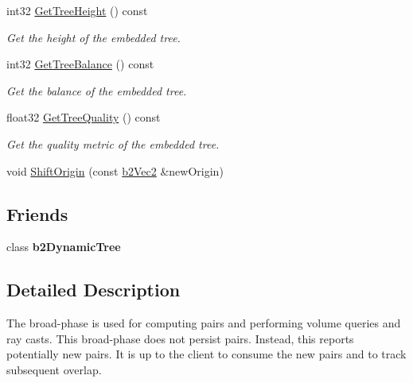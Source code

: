 \begin{DoxyCompactItemize}
int32 \hyperlink{classb2_broad_phase_a868f95225d62c3ea79d231ed305253ea}{Get\+Tree\+Height} () const
\begin{DoxyCompactList}\small\item\em Get the height of the embedded tree. \end{DoxyCompactList}\item 
\mbox{\label{classb2_broad_phase_a29612faf9f0191827440178629d5e887}} 
int32 \hyperlink{classb2_broad_phase_a29612faf9f0191827440178629d5e887}{Get\+Tree\+Balance} () const
\begin{DoxyCompactList}\small\item\em Get the balance of the embedded tree. \end{DoxyCompactList}\item 
\mbox{\label{classb2_broad_phase_a4e7d2f5d16ac100b18511e6a42e758bf}} 
float32 \hyperlink{classb2_broad_phase_a4e7d2f5d16ac100b18511e6a42e758bf}{Get\+Tree\+Quality} () const
\begin{DoxyCompactList}\small\item\em Get the quality metric of the embedded tree. \end{DoxyCompactList}\item 
void \hyperlink{classb2_broad_phase_a410e6115e3d1b4fca61cfbf397767772}{Shift\+Origin} (const \hyperlink{structb2_vec2}{b2\+Vec2} \&new\+Origin)
\end{DoxyCompactItemize}
\subsection*{Friends}
\begin{DoxyCompactItemize}
\item 
\mbox{\label{classb2_broad_phase_afc450dc71ee33ab0c9e7f1c31d6f7f60}} 
class {\bfseries b2\+Dynamic\+Tree}
\end{DoxyCompactItemize}


\subsection{Detailed Description}
The broad-\/phase is used for computing pairs and performing volume queries and ray casts. This broad-\/phase does not persist pairs. Instead, this reports potentially new pairs. It is up to the client to consume the new pairs and to track subsequent overlap. 

